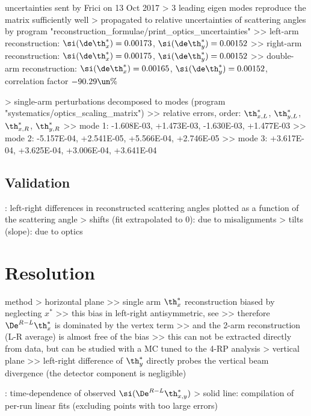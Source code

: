 \> uncertainties sent by Frici on 13 Oct 2017
\>> 3 leading eigen modes reproduce the matrix sufficiently well
\>> propagated to relative uncertainties of scattering angles by program "reconstruction\_formulae/print\_optics\_uncertainties"
\>>> left-arm reconstruction: $\si(\de\th^*_x) = 0.00173$, $\si(\de\th^*_y) = 0.00152$
\>>> right-arm reconstruction: $\si(\de\th^*_x) = 0.00175$, $\si(\de\th^*_y) = 0.00152$
\>>> double-arm reconstruction: $\si(\de\th^*_x) = 0.00165$, $\si(\de\th^*_y) = 0.00152$, correlation factor $-90.29\un{\%}$

\>> single-arm perturbations decomposed to modes (program "systematics/optics\_scaling\_matrix")
\>>> relative errors, order: $\th^*_{x,L}$, $\th^*_{y,L}$, $\th^*_{x,R}$, $\th^*_{y,R}$
\>>> mode 1: -1.608E-03, +1.473E-03, -1.630E-03, +1.477E-03
\>>> mode 2: -5.157E-04, +2.541E-05, +5.566E-04, +2.746E-05
\>>> mode 3: +3.617E-04, +3.625E-04, +3.006E-04, +3.641E-04


\section[optics-validation]{Validation}

\> : left-right differences in reconstructed scattering angles plotted as a function of the scattering angle
\>> shifts (fit extrapolated to 0): due to misalignments
\>> tilts (slope): due to optics



\chapter[resolution]{Resolution}

\> method
\>> horizontal plane
\>>> single arm $\th_x^*$ reconstruction biased by neglecting $x^*$
\>>> this bias in left-right antisymmetric, see 
\>>> therefore $\De^{R-L} \th_x^*$ is dominated by the vertex term
\>>> and the 2-arm reconstruction (L-R average) is almost free of the bias
\>>> this can not be extracted directly from data, but can be studied with a MC tuned to the 4-RP analysis
\>> vertical plane
\>>> left-right difference of $\th_y^*$ directly probes the vertical beam divergence (the detector component is negligible)

\>  : time-dependence of observed $\si(\De^{R-L} \th_{x, y}^*)$
\>> solid line: compilation of per-run linear fits (excluding points with too large errors)

